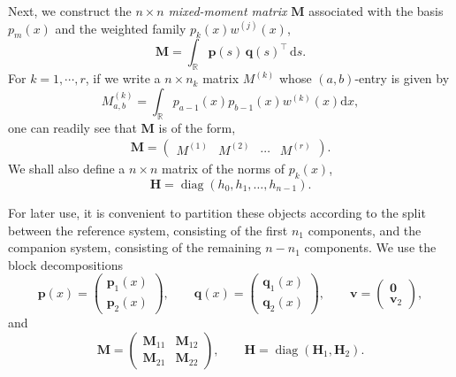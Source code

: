 \documentclass[a4paper,10pt,leqno]{amsart}
\numberwithin{equation}{section}
\theoremstyle{remark}
\newcommand{\dd}{\mathrm{d}}
\newcommand{\R}{\mathbb{R}}
\begin{document}
Next, we construct the $n \times n$ \textit{mixed-moment matrix} $\bm{M}$ associated with the basis $p_m(x)$ and the weighted family $p_k (x) w^{(j)}(x)$,
\begin{equation} \label{defn of M}
\bm{M} = \int_{\R} \bm{p}(s) \,\bm{q}(s)^\top \, \dd s.
\end{equation}
For $k = 1, \cdots, r$, if we write a $n \times n_k$ matrix $M^{(k)}$ whose $(a,b)$-entry is given by
\[
M^{(k)}_{a, b} = \int_{\R} p_{a-1}(x) p_{b-1}(x) w^{(k)}(x) \dd x,
\]
one can readily see that $\bm{M}$ is of the form,
\begin{align} \label{M=(M1 M2 ... Mr)}
\bm{M} = \begin{pmatrix}
    M^{(1)} & M^{(2)} & \cdots & M^{(r)}
\end{pmatrix}.
\end{align}
We shall also define a $n \times n$ matrix of the norms of $p_k(x)$,
\begin{equation} \label{defn of H}
    \bm{H} = \operatorname{diag}(h_0,h_1,\ldots, h_{n-1}).
\end{equation}

For later use, it is convenient to partition these objects according to the split
between the reference system, consisting of the first \(n_1\) components, and the
companion system, consisting of the remaining \(n-n_1\) components. We use the
block decompositions
\begin{equation} \label{defn of pi phi v, 1-2}
\bm{p}(x) =
\begin{pmatrix}
\bm{p}_1(x) \\
\bm{p}_2(x)
\end{pmatrix},
\qquad
\bm{q}(x) =
\begin{pmatrix}
\bm{q}_1(x) \\
\bm{q}_2(x)
\end{pmatrix},
\qquad
\bm{v} =
\begin{pmatrix}
\bm{0} \\
\bm{v}_2
\end{pmatrix},
\end{equation}
and
\begin{equation} \label{defn of M, H 4 blocks}
\bm{M} =
\begin{pmatrix}
\bm{M}_{11} & \bm{M}_{12} \\
\bm{M}_{21} & \bm{M}_{22}
\end{pmatrix},
\qquad
\bm{H} = \operatorname{diag}(\bm{H}_1,\bm{H}_2).
\end{equation}
\end{document}
